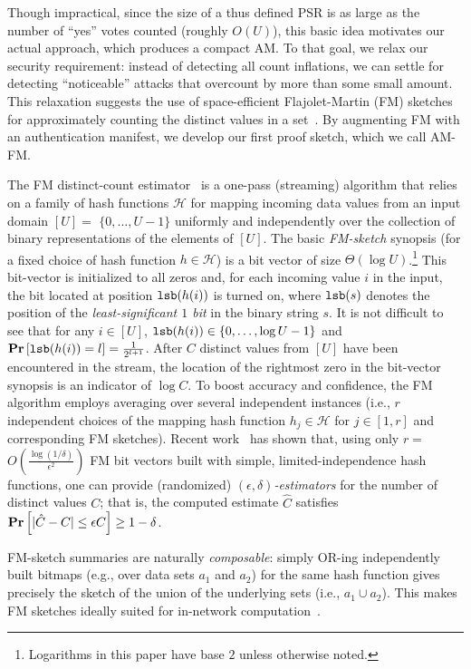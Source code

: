 \documentclass[10pt,twocolumn]{article}
\newcommand{\amfm}{AM-FM\xspace}
\newcommand{\proofsketch}{proof sketch\xspace}
\newcommand\vpar{{\vspace*{0.3em}}}
\newcommand{\stitle}[1]{\vpar\noindent{\bf #1\/}}
\newcommand{\lsb}{\mbox{\tt lsb}}
\newcommand\calH{{\mathcal H}}
\providecommand{\prob}[1]{{\bf Pr}\left[ #1 \right]}
\begin{document}
Though impractical, since the size of a thus defined PSR is as large as the
number of ``yes'' votes counted (roughly $O(U)$), this basic idea motivates our actual
approach, which produces a compact AM.  To that goal, we relax our
security requirement: instead of
detecting all count inflations, we can
settle for detecting ``noticeable'' attacks that overcount by more
than some small amount.  This relaxation suggests the use of
space-efficient Flajolet-Martin (FM) sketches for approximately
counting the distinct values in a set~\cite{Flajolet1985}.  By
augmenting FM with an authentication manifest, we develop our first
\proofsketch, which we call \amfm.


\stitle{Quick Introduction to FM Sketches.}
The FM distinct-count estimator~\cite{Flajolet1985} is a one-pass (streaming)
algorithm that relies on a family of  hash functions $\calH$ for
mapping incoming data values from an input domain $[U]=$ $\{0,\ldots, U-1\}$
uniformly and independently over the collection of binary
representations of the elements of $[U]$. 
The basic \emph{FM-sketch} synopsis (for a fixed choice of hash function $h\in\calH$)
is a bit vector of size $\Theta(\log U)$.\footnote{
Logarithms in this paper have base $2$ unless
otherwise noted.
}
This bit-vector  is initialized to all zeros and, for each incoming value $i$ in
the input, the bit located at position $\lsb(h(i))$ is turned on, where $\lsb(s)$ denotes the position
of the \emph{least-significant $1$ bit} in the binary string $s$.  It is
not difficult to see that for
any $i\in[U]$, $\lsb(h(i))\in\{ 0,\ldots, \log U -1\}$ and
$\prob{\lsb(h(i)) = l} = \frac{1}{2^{l+1}}$.
After $C$ distinct values from $[U]$ have been encountered in the
stream, the location of the rightmost zero in the bit-vector synopsis is an indicator of
$\log C$.  To boost accuracy and confidence, the FM algorithm employs averaging
over several independent instances (i.e., $r$ independent choices of the mapping
hash function $h_j\in\calH$ for $j \in [1,r]$ and corresponding FM sketches).
Recent work~\cite{Ganguly2003,Gibbons2001SPAA,BarYossef2002}
has shown that, using only  $r=$ $O(\frac{\log(1/\delta)}{\epsilon^2})$  FM bit vectors
built with simple, limited-independence hash functions, one can provide
(randomized) \emph{$(\epsilon, \delta)$-estimators} for the number of distinct
values $C$; that is, the computed estimate $\hat{C}$ satisfies \linebreak
$\prob{|\hat{C}-C|\leq \epsilon C}\geq 1-\delta$.

FM-sketch summaries are naturally
\emph{composable}: simply OR-ing independently built bitmaps 
(e.g., over data sets $a_1$ and $a_2$) for the same hash function gives
precisely the sketch of the union of the underlying sets
(i.e., $a_1\cup a_2$).
This makes FM sketches ideally suited for in-network
computation~\cite{Considine2004}.
\end{document}
